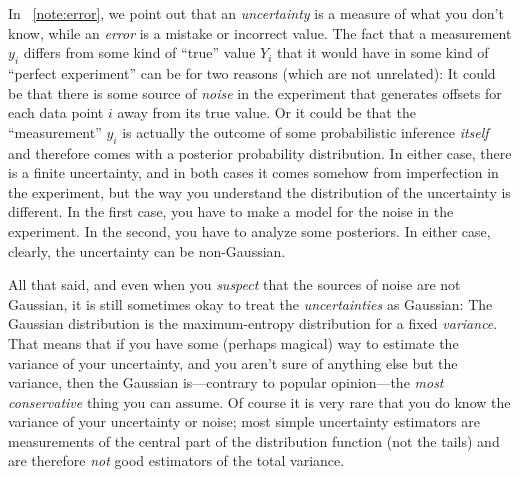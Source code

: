 \documentclass[12pt,twoside,pdftex]{article}
\begin{document}
In \notename~\ref{note:error}, we point out that an \emph{uncertainty} is
a measure of what you don't know, while an \emph{error} is a mistake
or incorrect value.  The fact that a measurement $y_i$ differs from
some kind of ``true'' value $Y_i$ that it would have in some kind of
``perfect experiment'' can be for two reasons (which are not
unrelated): It could be that there is some source of \emph{noise} in
the experiment that generates offsets for each data point $i$ away
from its true value.  Or it could be that the ``measurement'' $y_i$ is
actually the outcome of some probabilistic inference \emph{itself} and
therefore comes with a posterior probability distribution.  In either
case, there is a finite uncertainty, and in both cases it comes
somehow from imperfection in the experiment, but the way you
understand the distribution of the uncertainty is different.  In the
first case, you have to make a model for the noise in the experiment.
In the second, you have to analyze some posteriors.  In either case,
clearly, the uncertainty can be non-Gaussian.

All that said, and even when you \emph{suspect} that the sources of
noise are not Gaussian, it is still sometimes okay to treat the
\emph{uncertainties} as Gaussian: The Gaussian distribution is the
maximum-entropy distribution for a fixed \emph{variance}.  That means
that if you have some (perhaps magical) way to estimate the variance
of your uncertainty, and you aren't sure of anything else but the
variance, then the Gaussian is---contrary to popular opinion---the
\emph{most conservative} thing you can assume.  Of course it is very rare that you do know the
variance of your uncertainty or noise; most simple uncertainty
estimators are measurements of the central part of the distribution
function (not the tails) and are therefore \emph{not} good estimators
of the total variance.
\end{document}
